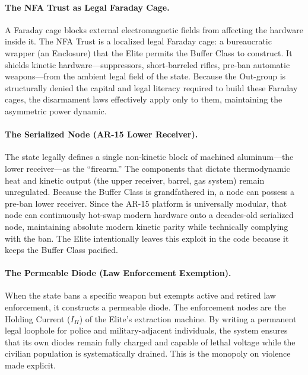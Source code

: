 \paragraph{The NFA Trust as Legal Faraday Cage.}
A Faraday cage blocks external electromagnetic fields from affecting the hardware inside it. The NFA Trust is a localized legal Faraday cage: a bureaucratic wrapper (an Enclosure) that the Elite permits the Buffer Class to construct. It shields kinetic hardware---suppressors, short-barreled rifles, pre-ban automatic weapons---from the ambient legal field of the state. Because the Out-group is structurally denied the capital and legal literacy required to build these Faraday cages, the disarmament laws effectively apply only to them, maintaining the asymmetric power dynamic.

\paragraph{The Serialized Node (AR-15 Lower Receiver).}
The state legally defines a single non-kinetic block of machined aluminum---the lower receiver---as the ``firearm.'' The components that dictate thermodynamic heat and kinetic output (the upper receiver, barrel, gas system) remain unregulated. Because the Buffer Class is grandfathered in, a node can possess a pre-ban lower receiver. Since the AR-15 platform is universally modular, that node can continuously hot-swap modern hardware onto a decades-old serialized node, maintaining absolute modern kinetic parity while technically complying with the ban. The Elite intentionally leaves this exploit in the code because it keeps the Buffer Class pacified.

\paragraph{The Permeable Diode (Law Enforcement Exemption).}
When the state bans a specific weapon but exempts active and retired law enforcement, it constructs a permeable diode. The enforcement nodes are the Holding Current ($I_H$) of the Elite's extraction machine. By writing a permanent legal loophole for police and military-adjacent individuals, the system ensures that its own diodes remain fully charged and capable of lethal voltage while the civilian population is systematically drained. This is the monopoly on violence made explicit.

